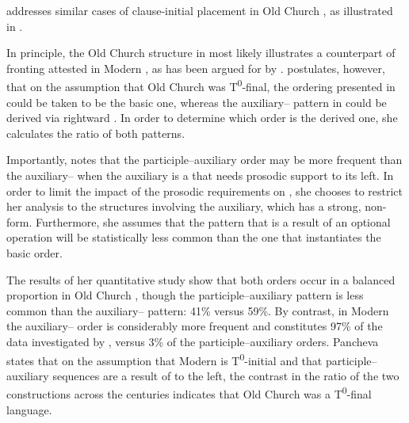 \documentclass[output=paper,modfonts,newtxmath,hidelinks]{langscibook}
\begin{document}
\citet{pancheva2008} addresses similar cases of clause-initial  placement in Old Church , as illustrated in .

\ea \label{11:ex16}
	\label{11:ex16a}
	\label{11:ex16b}
	\z
\z
In principle, the Old Church  structure in  most likely illustrates a counterpart of  fronting attested in Modern , as has been argued for by \citet[325--327]{willis2000}. \citet{pancheva2008} postulates, however, that on the assumption that Old Church  was T\textsuperscript{0}{}-final, the ordering presented in  could be taken to be the basic one, whereas the auxiliary– pattern in  could be derived via rightward . In order to determine which order is the derived one, she calculates the ratio of both patterns. 

Importantly, \citet{pancheva2008} notes that the participle--auxiliary order may be more frequent than the auxiliary-- when the auxiliary is a  that needs prosodic support to its left. In order to limit the impact of the prosodic requirements on , she chooses to restrict her analysis to the structures involving the  auxiliary, which has a strong, non- form. Furthermore, she assumes that the pattern that is a result of an optional operation will be statistically less common than the one that instantiates the basic order. 

The results of her quantitative study show that both orders occur in a balanced proportion in Old Church , though the participle--auxiliary pattern is less common than the auxiliary-- pattern: 41\% versus 59\%. By contrast, in Modern  the auxiliary-- order is considerably more frequent and constitutes 97\% of the data investigated by \citeauthor{pancheva2008}, versus 3\% of the participle--auxiliary orders. Pancheva states that on the assumption that Modern  is T\textsuperscript{0}{}-initial and that participle--auxiliary sequences are a result of  to the left, the contrast in the ratio of the two constructions across the centuries indicates that Old Church  was a T\textsuperscript{0}{}-final language.
\end{document}
